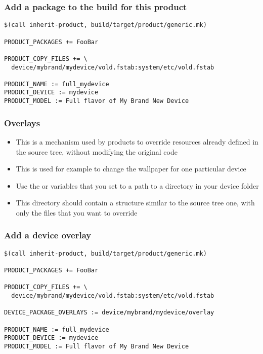 \begin{frame}[fragile]
  \frametitle{Add a package to the build for this product}
\begin{verbatim}
$(call inherit-product, build/target/product/generic.mk)

PRODUCT_PACKAGES += FooBar

PRODUCT_COPY_FILES += \
  device/mybrand/mydevice/vold.fstab:system/etc/vold.fstab

PRODUCT_NAME := full_mydevice
PRODUCT_DEVICE := mydevice
PRODUCT_MODEL := Full flavor of My Brand New Device
\end{verbatim}
\end{frame}

\begin{frame}
  \frametitle{Overlays}
  \begin{itemize}
  \item This is a mechanism used by products to override resources
    already defined in the source tree, without modifying the original
    code
  \item This is used for example to change the wallpaper for one
    particular device
  \item Use the  or
     variables that you set to a path
    to a directory in your device folder
  \item This directory should contain a structure similar to the
    source tree one, with only the files that you want to override
  \end{itemize}
\end{frame}


\begin{frame}[fragile]
  \frametitle{Add a device overlay}
\begin{verbatim}
$(call inherit-product, build/target/product/generic.mk)

PRODUCT_PACKAGES += FooBar

PRODUCT_COPY_FILES += \
  device/mybrand/mydevice/vold.fstab:system/etc/vold.fstab

DEVICE_PACKAGE_OVERLAYS := device/mybrand/mydevice/overlay

PRODUCT_NAME := full_mydevice
PRODUCT_DEVICE := mydevice
PRODUCT_MODEL := Full flavor of My Brand New Device
\end{verbatim}
\end{frame}

